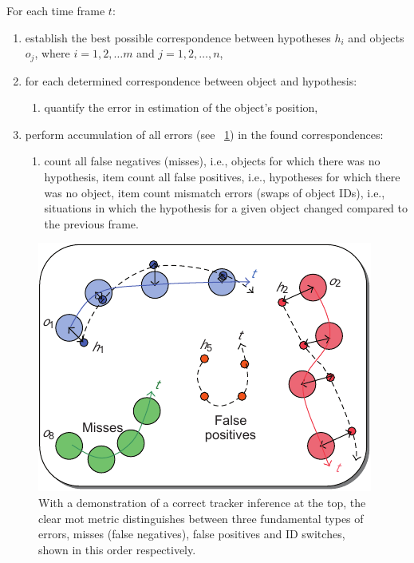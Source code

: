 For each time frame $t$:
\begin{enumerate}
    \item establish the best possible correspondence between hypotheses $h_i$ and objects $o_j$, where $i = 1, 2, \dots m$ and $j = 1, 2, \dots, n$,
    \item for each determined correspondence between object and hypothesis:
          \begin{enumerate}
              \item quantify the error in estimation of the object's position,
          \end{enumerate}
    \item perform accumulation of all errors (see \figstr{}~\ref{fig:CLEARHypotheses}) in the found correspondences:
          \begin{enumerate}
              \item count all false negatives (misses), i.e., objects for which there was no hypothesis,
                    item count all false positives, i.e., hypotheses for which there was no object,
                    item count mismatch errors (swaps of object IDs), i.e., situations in which the hypothesis for a given object changed compared to the previous frame.
          \end{enumerate}
\end{enumerate}


\begin{figure}[t]
    \centerline{\includegraphics[width=0.6\linewidth]{figures/theoretical_foundations/clear_hypotheses_status.pdf}}
    \caption[\gls{clear} hypotheses status]{With a demonstration of a correct tracker inference at the top, the \gls{clear} \gls{mot} metric distinguishes between three fundamental types of errors, misses (false negatives), false positives and ID switches, shown in this order respectively. }
    \label{fig:CLEARHypotheses}
\end{figure}

